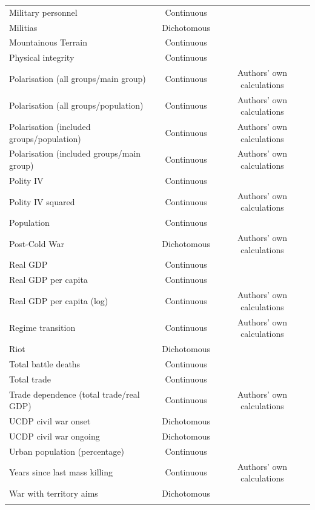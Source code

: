 \documentclass[a4paper,12pt]{article}
\begin{document}
\begin{table}[!htbp]
\begin{tabular}{@{\extracolsep{5pt}}lcc}
Military personnel & Continuous & \citet{cow2017cinc} \\ 
Militias & Dichotomous & \citet{carey2013states} \\ 
Mountainous Terrain & Continuous & \citet{fearon2003ethnicity} \\ 
Physical integrity & Continuous & \citet{cingranelli2010cingranelli}\\ 
Polarisation (all groups/main group) & Continuous &  Authors' own calculations \\ 
Polarisation (all groups/population) & Continuous &  Authors' own calculations  \\ 
Polarisation (included groups/population) & Continuous &  Authors' own calculations  \\ 
Polarisation (included groups/main group) & Continuous &  Authors' own calculations  \\ 
Polity IV & Continuous & \citet{marshall2017pitf}\\ 
Polity IV squared & Continuous & Authors' own calculations \\ 
Population & Continuous & \citet{gleditsch2002expanded} \\
Post-Cold War & Dichotomous & Authors' own calculations \\ 
Real GDP & Continuous & \citet{gleditsch2002expanded} \\ 
Real GDP per capita & Continuous & \citet{gleditsch2002expanded} \\ 
Real GDP per capita (log) & Continuous & Authors' own calculations  \\ 
Regime transition & Continuous & Authors' own calculations \\ 
Riot & Dichotomous & \citet{banks1999cross}\\ 
Total battle deaths & Continuous & \citet{lacina2005monitoring} \\  
Total trade & Continuous & \citet{cow2017cinc} \\ 
Trade dependence (total trade/real GDP) & Continuous & Authors' own calculations \\ 
UCDP civil war onset & Dichotomous & \citet{allansson2017organized,gleditsch2002armed} \\ 
UCDP civil war ongoing & Dichotomous & \citet{allansson2017organized,gleditsch2002armed} \\ 
Urban population (percentage) & Continuous & \citet{cow2017cinc} \\ 
Years since last mass killing & Continuous & Authors' own calculations \\ 
War with territory aims & Dichotomous & \citet{allansson2017organized,gleditsch2002armed} \\ 
\hline \\[-1.8ex] 
\end{tabular} 
\end{table} 
\end{document}
